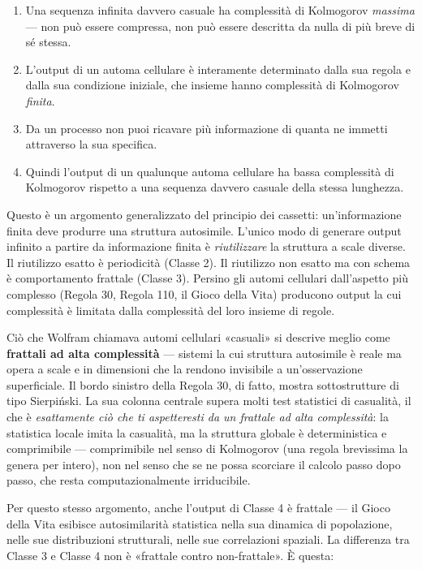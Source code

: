 \documentclass[11pt, twoside, openright]{book}
\begin{document}
\begin{enumerate}
  \item Una sequenza infinita davvero casuale ha complessità di Kolmogorov \textit{massima} --- non può essere compressa, non può essere descritta da nulla di più breve di sé stessa.
  \item L'output di un automa cellulare è interamente determinato dalla sua regola e dalla sua condizione iniziale, che insieme hanno complessità di Kolmogorov \textit{finita}.
  \item Da un processo non puoi ricavare più informazione di quanta ne immetti attraverso la sua specifica.
  \item Quindi l'output di un qualunque automa cellulare ha bassa complessità di Kolmogorov rispetto a una sequenza davvero casuale della stessa lunghezza.
\end{enumerate}

Questo è un argomento generalizzato del principio dei cassetti: un'informazione finita deve produrre una struttura autosimile. L'unico modo di generare output infinito a partire da informazione finita è \textit{riutilizzare} la struttura a scale diverse. Il riutilizzo esatto è periodicità (Classe 2). Il riutilizzo non esatto ma con schema è comportamento frattale (Classe 3). Persino gli automi cellulari dall'aspetto più complesso (Regola 30, Regola 110, il Gioco della Vita) producono output la cui complessità è limitata dalla complessità del loro insieme di regole.

Ciò che Wolfram chiamava automi cellulari «casuali» si descrive meglio come \textbf{frattali ad alta complessità} --- sistemi la cui struttura autosimile è reale ma opera a scale e in dimensioni che la rendono invisibile a un'osservazione superficiale. Il bordo sinistro della Regola 30, di fatto, mostra sottostrutture di tipo Sierpiński. La sua colonna centrale supera molti test statistici di casualità, il che è \textit{esattamente ciò che ti aspetteresti da un frattale ad alta complessità}: la statistica locale imita la casualità, ma la struttura globale è deterministica e comprimibile --- comprimibile nel senso di Kolmogorov (una regola brevissima la genera per intero), non nel senso che se ne possa scorciare il calcolo passo dopo passo, che resta computazionalmente irriducibile.

Per questo stesso argomento, anche l'output di Classe 4 è frattale --- il Gioco della Vita esibisce autosimilarità statistica nella sua dinamica di popolazione, nelle sue distribuzioni strutturali, nelle sue correlazioni spaziali. La differenza tra Classe 3 e Classe 4 non è «frattale contro non-frattale». È questa:
\end{document}
